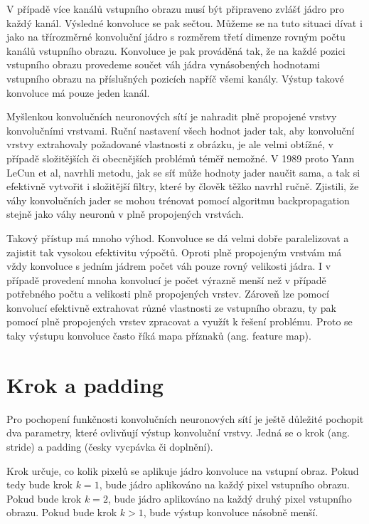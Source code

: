 V případě více kanálů vstupního obrazu musí být připraveno zvlášť jádro pro
každý kanál. Výsledné konvoluce se pak sečtou. Můžeme se na tuto situaci dívat
i jako na třírozměrné konvoluční jádro s rozměrem třetí dimenze rovným počtu
kanálů vstupního obrazu. Konvoluce je pak prováděná tak, že na každé pozici
vstupního obrazu provedeme součet váh jádra vynásobených hodnotami vstupního
obrazu na příslušných pozicích napříč všemi kanály. Výstup takové konvoluce má
pouze jeden kanál.

Myšlenkou konvolučních neuronových sítí je nahradit plně propojené vrstvy
konvolučními vrstvami. Ruční nastavení všech hodnot jader tak, aby konvoluční
vrstvy extrahovaly požadované vlastnosti z obrázku, je ale velmi obtížné, v
případě složitějších či obecnějších problémů téměř nemožné. V 1989 proto Yann
LeCun et al, navrhli metodu, jak se síť může hodnoty jader naučit sama, a tak
si efektivně vytvořit i složitější filtry, které by člověk těžko navrhl ručně.
Zjistili, že váhy konvolučních jader se mohou trénovat pomocí algoritmu
backpropagation stejně jako váhy neuronů v plně propojených vrstvách.

Takový přístup má mnoho výhod. Konvoluce se dá velmi dobře paralelizovat a
zajistit tak vysokou efektivitu výpočtů. Oproti plně propojeným vrstvám má vždy
konvoluce s jedním jádrem počet váh pouze rovný velikosti jádra. I v případě
provedení mnoha konvolucí je počet výrazně menší než v případě potřebného počtu
a velikosti plně propojených vrstev. Zároveň lze pomocí konvolucí efektivně
extrahovat různé vlastnosti ze vstupního obrazu, ty pak pomocí plně propojených
vrstev zpracovat a využít k řešení problému. Proto se taky výstupu konvoluce
často říká mapa příznaků (ang. feature map).

\section{Krok a padding}

Pro pochopení funkčnosti konvolučních neuronových sítí je ještě důležité
pochopit dva parametry, které ovlivňují výstup konvoluční vrstvy. Jedná se o
krok (ang. stride) a padding (česky vycpávka či doplnění).

Krok určuje, co kolik pixelů se aplikuje jádro konvoluce na vstupní obraz.
Pokud tedy bude krok $k = 1$, bude jádro aplikováno na každý pixel vstupního
obrazu. Pokud bude krok $k = 2$, bude jádro aplikováno na každý druhý pixel
vstupního obrazu. Pokud bude krok $k > 1$, bude výstup konvoluce násobně menší.

